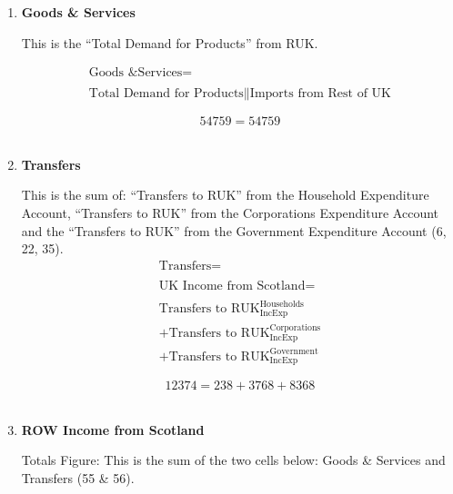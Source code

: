 \begin{enumerate}
\item \textbf {Goods \& Services}

This is the “Total Demand for Products” from RUK. \cite{ScotGov2013a}

\begin{equation}
\begin{split}
\text{Goods \& Services} =  \\ \\
\text{Total Demand for Products}\|\text{Imports from Rest of UK}
\end{split} \label{eq:2.5.56}
\end{equation}

\begin{equation} \nonumber
54759 = 54759
\end{equation}\\


\item \textbf {Transfers}

This is the sum of: “Transfers to RUK” from the Household Expenditure Account, “Transfers to RUK” from the Corporations Expenditure Account and the “Transfers to RUK” from the Government Expenditure Account (6, 22, 35).\\

\begin{equation}
\begin{split}
\text{Transfers} =  \\ \\
\text{UK Income from Scotland} =  \\ \\
\text{Transfers to RUK}^\text{Households}_\text{IncExp}\\
+\text{Transfers to RUK}^\text{Corporations}_\text{IncExp}\\
+\text{Transfers to RUK}^\text{Government}_\text{IncExp}
\end{split} \label{eq:2.5.57}
\end{equation}

\begin{equation} \nonumber
12374 = 238+3768+8368
\end{equation}\\


\item \textbf {ROW Income from Scotland}

Totals Figure: This is the sum of the two cells below: Goods \& Services and Transfers (55 \& 56).\\


\end{enumerate}
